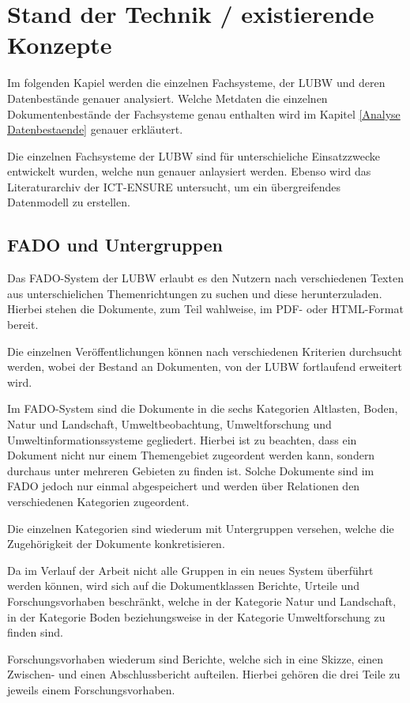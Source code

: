 \section{Stand der Technik / existierende Konzepte} \label{Stand der Technik}
Im folgenden Kapiel werden die einzelnen Fachsysteme, der \ac{LUBW} und deren Datenbest\"ande genauer analysiert. Welche Metdaten die einzelnen Dokumentenbest\"ande der Fachsysteme genau enthalten wird im Kapitel \ref{Analyse Datenbestaende} genauer erkl\"autert. 

Die einzelnen Fachsysteme der \ac{LUBW} sind f\"ur unterschieliche Einsatzzwecke entwickelt wurden, welche nun genauer anlaysiert werden.
Ebenso wird das Literaturarchiv der \ac{ICT-ENSURE} untersucht, um ein \"ubergreifendes Datenmodell zu erstellen.

\subsection{FADO und Untergruppen} \label{FADO}
Das \ac{FADO}-System der \ac{LUBW} erlaubt es den Nutzern nach verschiedenen Texten aus unterschielichen Themenrichtungen zu suchen und diese herunterzuladen. Hierbei stehen die Dokumente, zum Teil wahlweise, im PDF- oder HTML-Format bereit.

Die einzelnen Ver\"offentlichungen k\"onnen nach verschiedenen Kriterien durchsucht werden, wobei der Bestand an Dokumenten, von der \ac{LUBW} fortlaufend erweitert wird.
\cite{LUBW_FADO}

Im \ac{FADO}-System sind die Dokumente in die sechs Kategorien Altlasten, Boden, Natur und Landschaft, Umweltbeobachtung, Umweltforschung und Umweltinformationssysteme gegliedert. Hierbei ist zu beachten, dass ein Dokument nicht nur einem Themengebiet zugeordent werden kann, sondern durchaus unter mehreren Gebieten zu finden ist. Solche Dokumente sind im \ac{FADO} jedoch nur einmal abgespeichert und werden \"uber Relationen den verschiedenen Kategorien zugeordent.

Die einzelnen Kategorien sind wiederum mit Untergruppen versehen, welche die Zugeh\"origkeit der Dokumente konkretisieren.

Da im Verlauf der Arbeit nicht alle Gruppen in ein neues System \"uberf\"uhrt werden k\"onnen, wird sich auf die Dokumentklassen Berichte, Urteile und Forschungsvorhaben beschr\"ankt, welche in der Kategorie Natur und Landschaft, in der Kategorie Boden beziehungsweise in der Kategorie Umweltforschung zu finden sind.

Forschungsvorhaben wiederum sind Berichte, welche sich in eine Skizze, einen Zwischen- und einen Abschlussbericht aufteilen. Hierbei geh\"oren die drei Teile zu jeweils einem Forschungsvorhaben.

